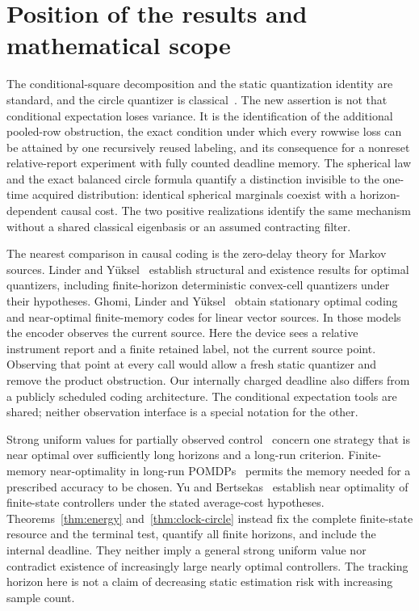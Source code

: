 \section{Position of the results and mathematical scope}\label{sec:literature}
The conditional-square decomposition and the static quantization identity are standard, and the circle quantizer is classical~\cite{GrafLuschgy,RosenblattRoychowdhury}. The new assertion is not that conditional expectation loses variance. It is the identification of the additional pooled-row obstruction, the exact condition under which every rowwise loss can be attained by one recursively reused labeling, and its consequence for a nonreset relative-report experiment with fully counted deadline memory. The spherical law and the exact balanced circle formula quantify a distinction invisible to the one-time acquired distribution: identical spherical marginals coexist with a horizon-dependent causal cost. The two positive realizations identify the same mechanism without a shared classical eigenbasis or an assumed contracting filter.

The nearest comparison in causal coding is the zero-delay theory for Markov sources. Linder and Y\"uksel~\cite{LinderYuksel} establish structural and existence results for optimal quantizers, including finite-horizon deterministic convex-cell quantizers under their hypotheses. Ghomi, Linder and Y\"uksel~\cite{GhomiLinderYuksel} obtain stationary optimal coding and near-optimal finite-memory codes for linear vector sources. In those models the encoder observes the current source. Here the device sees a relative instrument report and a finite retained label, not the current source point. Observing that point at every call would allow a fresh static quantizer and remove the product obstruction. Our internally charged deadline also differs from a publicly scheduled coding architecture. The conditional expectation tools are shared; neither observation interface is a special notation for the other.

Strong uniform values for partially observed control~\cite{VenelZiliotto} concern one strategy that is near optimal over sufficiently long horizons and a long-run criterion. Finite-memory near-optimality in long-run POMDPs~\cite{ChatterjeeSaonaZiliotto} permits the memory needed for a prescribed accuracy to be chosen. Yu and Bertsekas~\cite{YuBertsekas} establish near optimality of finite-state controllers under the stated average-cost hypotheses. Theorems~\ref{thm:energy} and~\ref{thm:clock-circle} instead fix the complete finite-state resource and the terminal test, quantify all finite horizons, and include the internal deadline. They neither imply a general strong uniform value nor contradict existence of increasingly large nearly optimal controllers. The tracking horizon here is not a claim of decreasing static estimation risk with increasing sample count.

